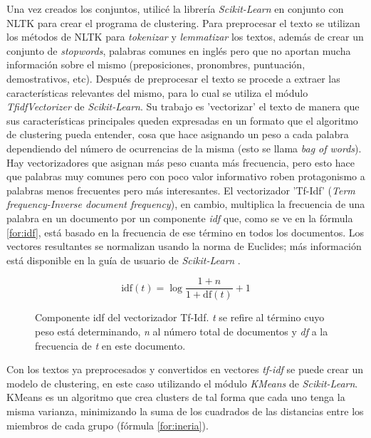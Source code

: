 \documentclass{pre-tfg}
\begin{document}
Una vez creados los conjuntos, utilicé la librería \textit{Scikit-Learn} en conjunto con NLTK para crear el programa de clustering. Para preprocesar el texto se utilizan los métodos de NLTK para \textit{tokenizar} y \textit{lemmatizar} los textos, además de crear un conjunto de \textit{stopwords}, palabras comunes en inglés pero que no aportan mucha información sobre el mismo (preposiciones, pronombres, puntuación, demostrativos, etc).
Después de preprocesar el texto se procede a extraer las características relevantes del mismo, para lo cual se utiliza el módulo \textit{TfidfVectorizer} de \textit{Scikit-Learn}. Su trabajo es 'vectorizar' el texto de manera que sus características principales queden expresadas en un formato que el algoritmo de clustering pueda entender, cosa que hace asignando un peso a cada palabra dependiendo del número de ocurrencias de la misma (esto se llama \textit{bag of words}). Hay vectorizadores que asignan más peso cuanta más frecuencia, pero esto hace que palabras muy comunes pero con poco valor informativo roben protagonismo a palabras menos frecuentes pero más interesantes. El vectorizador 'Tf-Idf' (\textit{Term frequency-Inverse document frequency}), en cambio, multiplica la frecuencia de una palabra en un documento por un componente \textit{idf} que, como se ve en la fórmula \ref{for:idf}, está basado en la frecuencia de ese término en todos los documentos. Los vectores resultantes se normalizan usando la norma de Euclides; más información está disponible en la guía de usuario de \textit{Scikit-Learn} \cite{sklearn_feature}. 

\begin{figure}
	\begin{equation}
	\text{idf}(t) = \log{\frac{1+n}{1+\text{df}(t)}}+1 
	\label{for:idf}
	\end{equation}
	\caption{Componente idf del vectorizador Tf-Idf. \textit
		{t} se refire al término cuyo peso está determinando, \textit{n} al número total de documentos y \textit{df} a la frecuencia de \textit{t} en este documento.}
	
\end{figure}

Con los textos ya preprocesados y convertidos en vectores \textit{tf-idf} se puede crear un modelo de clustering, en este caso utilizando el módulo \textit{KMeans} de \textit{Scikit-Learn}. KMeans es un algoritmo que crea clusters de tal forma que cada uno tenga la misma varianza, minimizando la suma de los cuadrados de las distancias entre los miembros de cada grupo (fórmula \ref{for:ineria}).
\end{document}
